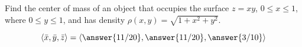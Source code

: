 \documentclass{ximera}
\author{David Guichard \and Neal Koblitz \and H. Jerome Keisler \and Albert Scheller \and Barry Balof \and Mike Wills \and Matthew Carr}
\begin{document}
\begin{exercise}




Find the center of mass of an object that occupies the surface $z=xy$, $0\le x\le 1$, where $0\le y\le 1$, and has density $\rho(x,y)=\sqrt{1+x^2+y^2}$.
\begin{prompt}
\[
\vector{\bar{x},\bar{y},\bar{z}}=\vector{\answer{11/20},\answer{11/20},\answer{3/10}}
\]
\end{prompt}


\end{exercise}
\end{document}
